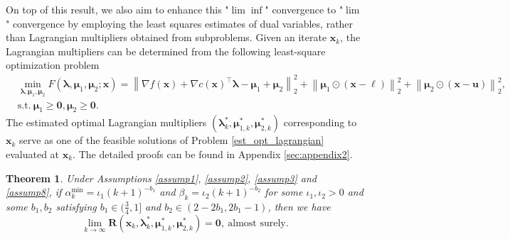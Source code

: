 \documentclass[aos]{imsart}
\numberwithin{equation}{section}
\theoremstyle{plain}
\newtheorem{theorem}{Theorem}
\begin{document}
On top of this result, we also aim to enhance this "$\lim \inf$" convergence to "$\lim$" convergence by employing the least squares estimates of dual variables, rather than Lagrangian multipliers obtained from subproblems. Given an iterate $\bm{x}_k$, the Lagrangian multipliers can be determined from the following least-square optimization problem
\begin{equation}
\label{est_opt_lagrangian}
\begin{split}
    & \min_{\bm{\lambda}, \bm{\mu}_{1}, \bm{\mu}_{2}} F(\bm{\lambda}, \bm{\mu}_{1}, \bm{\mu}_2; \bm{x}) =  \left\| \nabla f(\bm{x}) + \nabla c(\bm{x})^{\top} \bm{\lambda} - \bm{\mu}_{1} + \bm{\mu}_2 \right\|_2^2 + \left\| \bm{\mu}_{1} \odot \left( \bm{x} - \bm{\ell} \right) \right\|_2^2 + \left\| \bm{\mu}_{2} \odot \left( \bm{x} - \bm{u} \right) \right\|_2^2, \\
    & \text{s.t.}~ \bm{\mu}_{1} \geq \bm{0}, \bm{\mu}_2 \geq \bm{0}.
\end{split}
\end{equation}
The estimated optimal Lagrangian multipliers   $(\bm{\lambda}_{k}^{*}, \bm{\mu}_{1,k}^{*}, \bm{\mu}_{2,k}^{*})$ corresponding to $\bm{x}_k$ serve as one of the feasible solutions of Problem \eqref{est_opt_lagrangian} evaluated at $\bm{x}_k$. The detailed proofs can be found in Appendix \ref{sec:appendix2}.

\begin{theorem}\label{theorem_lim}
    Under Assumptions \ref{assump1}, \ref{assump2}, \ref{assump3} and \ref{assump8}, if $\alpha_k^{\text{min}} = \iota_1 (k+1)^{-b_1}$ and $\beta_k = \iota_2 (k+1)^{-b_2}$ for some $\iota_1, \iota_2 >0$ and some $b_1, b_2$ satisfying $b_1 \in (\frac{3}{4},1]$ and $b_2 \in \left( 2-2b_1,2b_1-1\right)$, then we have
     \begin{equation}
        \lim_{k \to \infty} \bm{R}(\bm{x}_{k},\bm{\lambda}_{k}^{*},\bm{\mu}_{1,k}^{*},\bm{\mu}_{2,k}^{*}) = \bm{0},~\text{almost surely}.
\end{equation}
    
\end{theorem}
\end{document}
